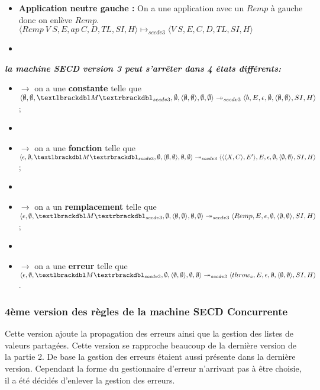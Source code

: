 \documentclass[10pt,a4paper]{report}
\begin{document}
\begin{itemize}
\begin{itemize}
  \item[] \textbf{Application neutre gauche :} On a une application avec un $Remp$ à gauche donc on enlève $Remp$.
    \smallbreak
    $\langle Remp~V~S,E,ap~C,D,TL,SI,H\rangle \longmapsto_{secdv3} \langle V~S,E,C,D,TL,SI,H\rangle$
  \item[]
  \end{itemize}
\end{itemize}
\bigbreak
\bigbreak

\textbf{\textit{la machine SECD version 3 peut s'arrêter dans 4 états différents:}}
\smallbreak
\begin{itemize}
\item[]$\longrightarrow$ on a une \textbf{constante} telle que $\langle \emptyset,\emptyset,\textlbrackdbl M\textrbrackdbl_{secdv3},\emptyset,\langle\emptyset,\emptyset\rangle,\emptyset,\emptyset\rangle \twoheadrightarrow_{secdv3} \langle b,E,\epsilon,\emptyset,\langle\emptyset,\emptyset\rangle,SI,H\rangle$;
\item[]
\item[]$\longrightarrow$ on a une \textbf{fonction} telle que $\langle \epsilon,\emptyset,\textlbrackdbl M\textrbrackdbl_{secdv3},\emptyset,\langle\emptyset,\emptyset\rangle,\emptyset,\emptyset\rangle \twoheadrightarrow_{secdv3} \langle\langle\langle X,C\rangle,E'\rangle,E,\epsilon,\emptyset,\langle\emptyset,\emptyset\rangle,SI,H\rangle$;
\item[]
\item[]$\longrightarrow$ on a un \textbf{remplacement} telle que $\langle \epsilon,\emptyset,\textlbrackdbl M\textrbrackdbl_{secdv3},\emptyset,\langle\emptyset,\emptyset\rangle,\emptyset,\emptyset\rangle \twoheadrightarrow_{secdv3} \langle Remp,E,\epsilon,\emptyset,\langle\emptyset,\emptyset\rangle,SI,H\rangle$;
\item[]
\item[]$\longrightarrow$ on a une \textbf{erreur} telle que $\langle \epsilon,\emptyset,\textlbrackdbl M\textrbrackdbl_{secdv3},\emptyset,\langle\emptyset,\emptyset\rangle,\emptyset,\emptyset\rangle \twoheadrightarrow_{secdv3} \langle throw_{e},E,\epsilon,\emptyset,\langle\emptyset,\emptyset\rangle,SI,H\rangle$.
\end{itemize}
\newpage



\subsubsection{4ème version des règles de la machine SECD Concurrente}
Cette version ajoute la propagation des erreurs ainsi que la gestion des listes de valeurs partagées. Cette version se rapproche beaucoup de la dernière version de la partie 2. De base la gestion des erreurs étaient aussi présente dans la dernière version. Cependant la forme du gestionnaire d'erreur n'arrivant pas à être choisie, il a été décidés d'enlever la gestion des erreurs.
\bigbreak
\end{document}
